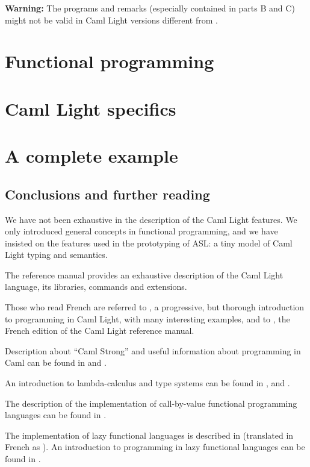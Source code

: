 \medskip

{\bf Warning:} The programs and remarks (especially contained in parts
B and C) might not be valid in Caml Light versions different from
\CAMLVERSION.

\part{Functional programming}





\part{Caml Light specifics}





\part{A complete example}



\chapter{Conclusions and further reading}

We have not been exhaustive in the description of the Caml Light features.
We only introduced general concepts in functional programming, and we
have insisted on the features used in the prototyping of ASL:
a tiny model of Caml Light typing and semantics.

The reference manual \cite{CamlLightDoc} provides an exhaustive
description of the Caml Light language, its libraries, commands and
extensions.

Those who read French are referred to \cite{Weis-Leroy}, a
progressive, but thorough introduction to programming in Caml Light,
with many interesting examples, and to \cite{Leroy-Weis}, the French
edition of the Caml Light reference manual.

Description about ``Caml Strong'' and useful information about
programming in Caml can be found in \cite{CAMLPrimer} and
\cite{CAMLRefMan}.

An introduction to lambda-calculus and type systems can be found in
\cite{Krivine}, \cite{Hindley} and \cite{Barendregt}.

The description of the implementation of call-by-value functional
programming languages can be found in \cite{ZINC}.

The implementation of lazy functional languages is described in
\cite{Peyton} (translated in French as \cite{FPeyton}).
An introduction to programming in lazy functional languages can be
found in \cite{Bird}.





